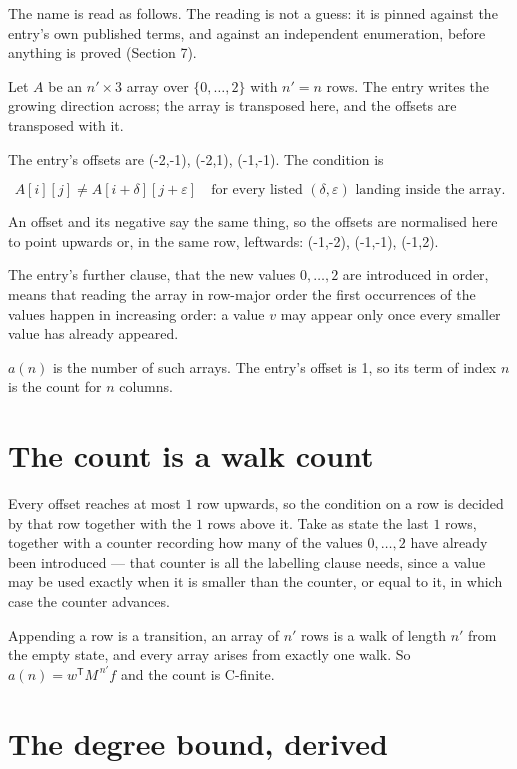 \documentclass[11pt]{article}
\theoremstyle{definition}
\begin{document}
The name is read as follows. The reading is not a guess: it is pinned against the entry's own published terms, and against an independent enumeration, before anything is proved (Section 7).

Let $A$ be an $n' \times 3$ array over $\{0,\dots,2\}$ with $n' = n$ rows. The entry writes the growing direction across; the array is transposed here, and the offsets are transposed with it.

The entry's offsets are (-2,-1), (-2,1), (-1,-1). The condition is

\[A[i][j] \ne A[i{+}\delta][j{+}\varepsilon]\quad\text{for every listed }(\delta,\varepsilon)\text{ landing inside the array.}\]

An offset and its negative say the same thing, so the offsets are normalised here to point upwards or, in the same row, leftwards: (-1,-2), (-1,-1), (-1,2).

The entry's further clause, that the new values $0,\dots,2$ are introduced in order, means that reading the array in row-major order the first occurrences of the values happen in increasing order: a value $v$ may appear only once every smaller value has already appeared.

$a(n)$ is the number of such arrays. The entry's offset is 1, so its term of index $n$ is the count for $n$ columns.

\section{The count is a walk count}

Every offset reaches at most $1$ row upwards, so the condition on a row is decided by that row together with the $1$ rows above it. Take as state the last $1$ rows, together with a counter recording how many of the values $0,\dots,2$ have already been introduced --- that counter is all the labelling clause needs, since a value may be used exactly when it is smaller than the counter, or equal to it, in which case the counter advances.

Appending a row is a transition, an array of $n'$ rows is a walk of length $n'$ from the empty state, and every array arises from exactly one walk. So $a(n) = w^{\mathsf T}M^{\,n'}f$ and the count is C-finite.

\section{The degree bound, derived}
\end{document}
